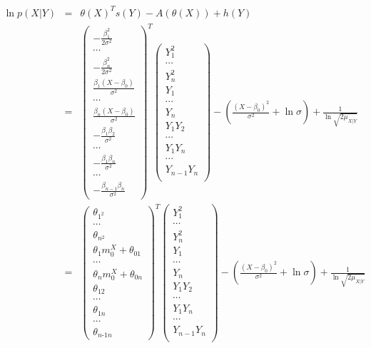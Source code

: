\documentclass[11pt, oneside]{article}   	%
\numberwithin{figure}{section}
\numberwithin{equation}{section}
\numberwithin{table}{section}
\begin{document}
\begin{itemize}
\begin{eqnarray*}
\ln p(X|Y) &=& \theta(X)^T s(Y) - A(\theta(X)) + h(Y)\\
&=&
\begin{pmatrix}
-\frac{\beta_1^2}{2\sigma^2}\\
\cdots\\
-\frac{\beta_n^2}{2\sigma^2}\\
\frac{\beta_1(X-\beta_0)}{\sigma^2}\\
\cdots\\
\frac{\beta_n(X-\beta_0)}{\sigma^2}\\
-\frac{\beta_1\beta_2}{\sigma^2}\\
\cdots\\
-\frac{\beta_1\beta_n}{\sigma^2}\\
\cdots\\
-\frac{\beta_{n-1}\beta_n}{\sigma^2}
\end{pmatrix}^T
\begin{pmatrix}
Y_1^2\\
\cdots\\
Y_n^2\\
Y_1\\
\cdots\\
Y_n\\
Y_1 Y_2\\
\cdots\\
Y_1 Y_n\\
\cdots\\
Y_{n-1}Y_{n}\\
\end{pmatrix}
- \left( \frac{(X-\beta_0)^2}{\sigma^2} + \ln{\sigma} \right) + \frac{1}{\ln{\sqrt{2\mu_{X|Y}}}}\\
&=&
\begin{pmatrix}
\theta_{1^2}\\
\cdots\\
\theta_{n^2}\\
\theta_1 m_0^X+\theta_{01}\\
\cdots\\
\theta_n m_0^X+\theta_{0n}\\
\theta_{12}\\
\cdots\\
\theta_{1n}\\
\cdots\\
\theta_{n\mbox{-}1n}
\end{pmatrix}^T
\begin{pmatrix}
Y_1^2\\
\cdots\\
Y_n^2\\
Y_1\\
\cdots\\
Y_n\\
Y_1 Y_2\\
\cdots\\
Y_1 Y_n\\
\cdots\\
Y_{n-1}Y_{n}\\
\end{pmatrix}
- \left( \frac{(X-\beta_0)^2}{\sigma^2} + \ln{\sigma} \right) + \frac{1}{\ln{\sqrt{2\mu_{X|Y}}}}
\end{eqnarray*}

\end{itemize}
\end{document}
